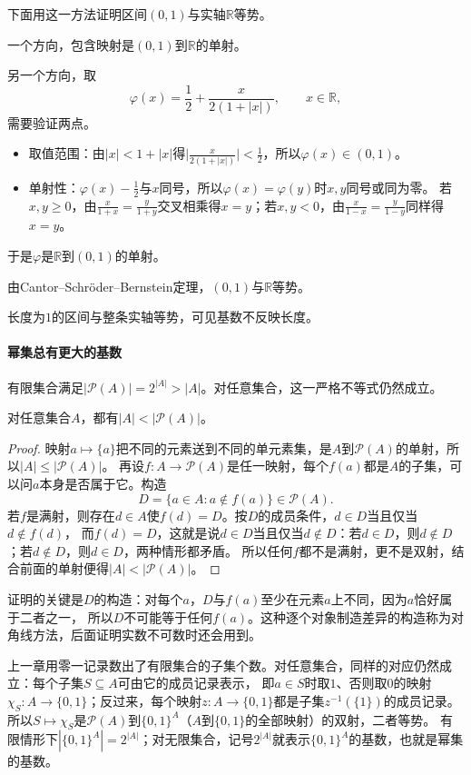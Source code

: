 下面用这一方法证明区间$(0,1)$与实轴$\mathbb R$等势。
\begin{example}
\label{ex:card-interval-real-line}
一个方向，包含映射是$(0,1)$到$\mathbb R$的单射。

另一个方向，取
\[
 \varphi(x)=\frac12+\frac{x}{2(1+|x|)},\qquad x\in\mathbb R,
\]
需要验证两点。
\begin{itemize}
 \item 取值范围：由$|x|<1+|x|$得$\bigl|\frac{x}{2(1+|x|)}\bigr|<\frac12$，所以$\varphi(x)\in(0,1)$。
 \item 单射性：$\varphi(x)-\frac12$与$x$同号，所以$\varphi(x)=\varphi(y)$时$x,y$同号或同为零。
       若$x,y\geq0$，由$\frac{x}{1+x}=\frac{y}{1+y}$交叉相乘得$x=y$；若$x,y<0$，由$\frac{x}{1-x}=\frac{y}{1-y}$同样得$x=y$。
\end{itemize}
于是$\varphi$是$\mathbb R$到$(0,1)$的单射。

由Cantor--Schröder--Bernstein定理，$(0,1)$与$\mathbb R$等势。
\end{example}

长度为$1$的区间与整条实轴等势，可见基数不反映长度。

\paragraph{幂集总有更大的基数}
有限集合满足$|\mathcal P(A)|=2^{|A|}>|A|$。对任意集合，这一严格不等式仍然成立。
\begin{theorem}[Cantor定理]
\label{thm:comb-cantor-power-set}
对任意集合$A$，都有$|A|<|\mathcal P(A)|$。
\end{theorem}
\begin{proof}
映射$a\mapsto\{a\}$把不同的元素送到不同的单元素集，是$A$到$\mathcal P(A)$的单射，所以$|A|\leq|\mathcal P(A)|$。
再设$f:A\to\mathcal P(A)$是任一映射，每个$f(a)$都是$A$的子集，可以问$a$本身是否属于它。构造
\[
 D=\{a\in A:a\notin f(a)\}\in\mathcal P(A).
\]
若$f$是满射，则存在$d\in A$使$f(d)=D$。按$D$的成员条件，$d\in D$当且仅当$d\notin f(d)$，
而$f(d)=D$，这就是说$d\in D$当且仅当$d\notin D$：若$d\in D$，则$d\notin D$；若$d\notin D$，则$d\in D$，两种情形都矛盾。
所以任何$f$都不是满射，更不是双射，结合前面的单射便得$|A|<|\mathcal P(A)|$。
\end{proof}
证明的关键是$D$的构造：对每个$a$，$D$与$f(a)$至少在元素$a$上不同，因为$a$恰好属于二者之一，
所以$D$不可能等于任何$f(a)$。这种逐个对象制造差异的构造称为对角线方法，后面证明实数不可数时还会用到。

上一章用零一记录数出了有限集合的子集个数。对任意集合，同样的对应仍然成立：每个子集$S\subseteq A$可由它的成员记录表示，
即$a\in S$时取$1$、否则取$0$的映射$\chi_S:A\to\{0,1\}$；反过来，每个映射$z:A\to\{0,1\}$都是子集$z^{-1}(\{1\})$的成员记录。
所以$S\mapsto\chi_S$是$\mathcal P(A)$到$\{0,1\}^A$（$A$到$\{0,1\}$的全部映射）的双射，二者等势。
有限情形下$|\{0,1\}^A|=2^{|A|}$；对无限集合，记号$2^{|A|}$就表示$\{0,1\}^A$的基数，也就是幂集的基数。

